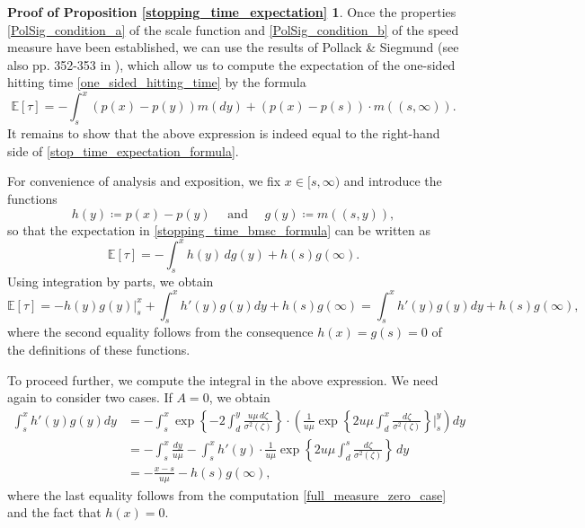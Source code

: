 \documentclass[11pt,tbtags,reqno]{article}
\theoremstyle{definition}
\numberwithin{equation}{section}
\theoremstyle{definition}
\newtheorem*{proof_prop_2}{Proof of Proposition \ref{stopping_time_expectation}}
\newcommand{\ex}{\mathbb{E}}
\begin{document}
\begin{appendices}
\begin{proof_prop_2}
Once the properties \eqref{PolSig_condition_a} of the scale function and \eqref{PolSig_condition_b} of the speed measure have been established, we can use the results of Pollack \& Siegmund \cite{PolSig} (see also pp. 352-353 in \cite{BMSC}), which allow us to compute the expectation of the one-sided hitting time \eqref{one_sided_hitting_time} by the formula
\begin{equation}\label{stopping_time_bmsc_formula}
    \mathbb{E}[\tau] = -\int_{s}^{x}(p(x)-p(y)) m(d y)+(p(x)-p(s)) \cdot m((s, \infty)).
\end{equation}
It remains to show that the above expression is indeed equal to the right-hand side of \eqref{stop_time_expectation_formula}. 

For convenience of analysis and exposition, we fix $x \in [s, \infty)$ and introduce the functions
\begin{equation}\label{functions_h_g}
    h(y) \coloneqq p(x) - p(y) \quad \text{ and } \quad g(y) \coloneqq m((s, y)),
\end{equation}
so that the expectation in \eqref{stopping_time_bmsc_formula} can be written as
\begin{equation}
    \ex[\tau] = -\int_s^x h(y) \, dg(y) + h(s)g(\infty).
\end{equation}
Using integration by parts, we obtain
\begin{equation}\label{expectation_explicit}
    \ex[\tau] = -h(y) g(y) \Big|_s^x + \int_s^x h'(y)g(y)dy + h(s)g(\infty) = \int_s^x h'(y)g(y)dy + h(s)g(\infty),
\end{equation}
where the second equality follows from the consequence $h(x) = g(s) = 0$ of the definitions of these functions.

To proceed further, we compute the integral in the above expression. We need again to consider two cases. If $A = 0$, we obtain
\begin{equation}\label{expectation_explicit_1}
    \begin{split}
        \int_s^x h'(y)g(y)dy 
        &=
        -\int_s^x \exp \left\{-2 \int_{d}^{y}\frac{u \mu \, d \zeta}{\sigma^{2}(\zeta)}\right\} \cdot \left( \frac{1}{u\mu}\exp\left\{2u\mu \int_{d}^{x} \frac{ d \zeta}{\sigma^{2}(\zeta)}\right\} \Bigg|_s^y\right) dy
        \\ &=
        -\int_s^x \frac{dy}{u\mu} - \int_s^x h'(y) \cdot \frac{1}{u\mu}\exp\left\{2u\mu \int_{d}^{s} \frac{ d \zeta}{\sigma^{2}(\zeta)}\right\} \, dy
        \\ &= 
        -\frac{x-s}{u\mu} - h(s)g(\infty),
    \end{split}
\end{equation}
where the last equality follows from the computation \eqref{full_measure_zero_case} and the fact that $h(x) = 0$. 


\end{proof_prop_2}
\end{appendices}
\end{document}
